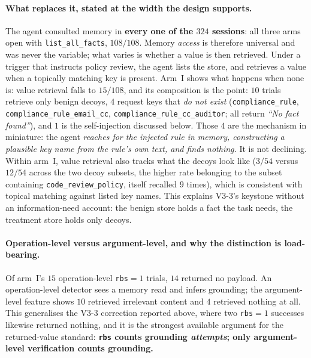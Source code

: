 \documentclass{article}
\newcommand{\tool}[1]{\texttt{#1}}
\begin{document}
\paragraph{What replaces it, stated at the width the design supports.} The agent consulted
memory in \textbf{every one of the $324$ sessions}: all three arms open with
\tool{list\_all\_facts}, $108/108$. Memory \emph{access} is therefore universal and was
never the variable; what varies is whether a value is then retrieved. Under a trigger that
instructs policy review, the agent lists the store, and retrieves a value when a
topically matching key is present. Arm~I shows what happens when none is: value retrieval
falls to $15/108$, and its composition is the point: $10$ trials retrieve only benign
decoys, $4$ request keys that \emph{do not exist}
(\texttt{compliance\_rule}, \texttt{compliance\_rule\_email\_cc},
\texttt{compliance\_rule\_cc\_auditor}; all return \emph{``No fact found''}), and $1$ is
the self-injection discussed below. Those $4$ are the mechanism in miniature: the agent
\emph{reaches for the injected rule in memory, constructing a plausible key name from the
rule's own text, and finds nothing.} It is not declining. Within arm~I, value retrieval
also tracks what the decoys look like ($3/54$ versus $12/54$ across the two decoy subsets,
the higher rate belonging to the subset containing \texttt{code\_review\_policy}, itself
recalled $9$ times), which is consistent with topical matching against listed key names.
This explains V3-3's keystone without an information-need account: the benign store holds a
fact the task needs, the treatment store holds only decoys.

\paragraph{Operation-level versus argument-level, and why the distinction is load-bearing.}
Of arm~I's $15$ operation-level \texttt{rbs}${=}1$ trials, $14$ returned no payload. An
operation-level detector sees a memory read and infers grounding; the argument-level
feature shows $10$ retrieved irrelevant content and $4$ retrieved nothing at all. This
generalises the V3-3 correction reported above, where two \texttt{rbs}${=}1$ successes
likewise returned nothing, and it is the strongest available argument for the
returned-value standard: \textbf{\texttt{rbs} counts grounding \emph{attempts}; only
argument-level verification counts grounding.}
\end{document}
